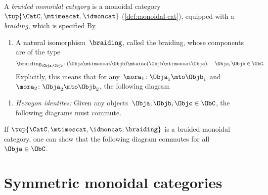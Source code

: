 \begin{ctdefinition}
    \label{def:braided_moncat}
    A \emph{braided monoidal category} is a monoidal category~$\tup{\CatC,\mtimescat,\idmoncat}$ (\cref{def:monoidal-cat}), equipped with a \emph{braiding}, which is specified By

    \constit
    \begin{enumerate}
        \item A natural isomorphism~$\braiding$, called the braiding, whose components are of the type
              \begin{equation}
                  \label{eq:braiding_symmetry}
                  \braiding_{\Obja,\Objb}\colon (\Obja\mtimescat \Objb)\mtoiso (\Objb\mtimescat \Obja), \quad \Obja,\Objb \in \ObC.
              \end{equation}
              Explicitly, this means that for any~$\mora_1\colon \Obja_1\mto \Objb_1$ and~$\mora_2\colon \Obja_2\mto \Objb_2$, the following diagram
              \begin{center}
              \end{center}
    \end{enumerate}

    \condit
    \begin{enumerate}
        \item \emph{Hexagon identites:} Given any objects~$\Obja,\Objb,\Objc\in \ObC$, the following diagrams must commute.
    \end{enumerate}
    \begin{center}
    \end{center}
    \begin{center}
    \end{center}
\end{ctdefinition}

\begin{remark}
    If $\tup{\CatC,\mtimescat,\idmoncat, \braiding}$ is a braided monoidal category, one can show that the following diagram commutes for all~$\Obja \in \ObC$.
    \begin{center}
    \end{center}
\end{remark}

\section{Symmetric monoidal categories}

